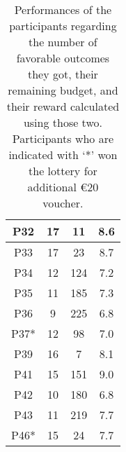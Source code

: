 \begin{table}[h]
{\begin{tabular}{|c|c|c|c|}
P32 & 17 & 11 & 8.6 \\ \hline
P33 & 17 & 23 & 8.7 \\ \hline
P34 & 12 & 124 & 7.2 \\ \hline
P35 & 11 & 185 & 7.3 \\ \hline
P36 & 9 & 225 & 6.8 \\ \hline
P37* & 12 & 98 & 7.0 \\ \hline
P39 & 16 & 7 & 8.1 \\ \hline
P41 & 15 & 151 & 9.0 \\ \hline
P42 & 10 & 180 & 6.8 \\ \hline
P43 & 11 & 219 & 7.7 \\ \hline
P46* & 15 & 24 & 7.7 \\ \hline
    \end{tabular}
    }
    \caption{Performances of the participants regarding the number of favorable outcomes they got, their remaining budget, and their reward calculated using those two. Participants who are indicated with `*' won the lottery for additional €20 voucher.}
    \label{tab:participant_performances}
\end{table}